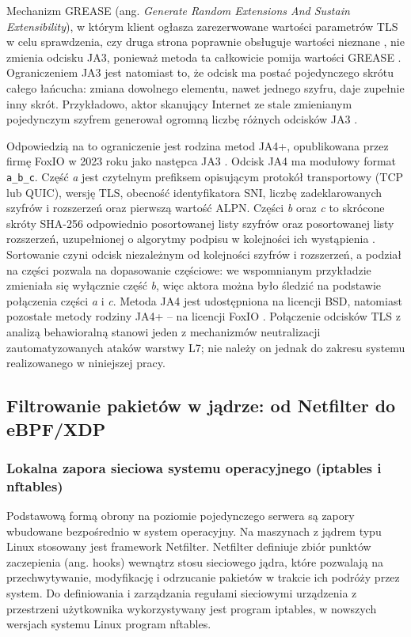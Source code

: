 \documentclass[a4paper,12pt]{article}
\begin{document}
Mechanizm GREASE (ang. \textit{Generate Random Extensions And Sustain Extensibility}), w którym klient ogłasza zarezerwowane wartości parametrów TLS w celu sprawdzenia, czy druga strona poprawnie obsługuje wartości nieznane \cite{rfc8701}, nie zmienia odcisku JA3, ponieważ metoda ta całkowicie pomija wartości GREASE \cite{althouse2017ja3}. Ograniczeniem JA3 jest natomiast to, że odcisk ma postać pojedynczego skrótu całego łańcucha: zmiana dowolnego elementu, nawet jednego szyfru, daje zupełnie inny skrót. Przykładowo, aktor skanujący Internet ze stale zmienianym pojedynczym szyfrem generował ogromną liczbę różnych odcisków JA3 \cite{althouse2023ja4}.

Odpowiedzią na to ograniczenie jest rodzina metod JA4+, opublikowana przez firmę FoxIO w 2023 roku jako następca JA3 \cite{althouse2023ja4}. Odcisk JA4 ma modułowy format \texttt{a\_b\_c}. Część \textit{a} jest czytelnym prefiksem opisującym protokół transportowy (TCP lub QUIC), wersję TLS, obecność identyfikatora SNI, liczbę zadeklarowanych szyfrów i rozszerzeń oraz pierwszą wartość ALPN. Części \textit{b} oraz \textit{c} to skrócone skróty SHA-256 odpowiednio posortowanej listy szyfrów oraz posortowanej listy rozszerzeń, uzupełnionej o algorytmy podpisu w kolejności ich wystąpienia \cite{althouse2023ja4}. Sortowanie czyni odcisk niezależnym od kolejności szyfrów i rozszerzeń, a podział na części pozwala na dopasowanie częściowe: we wspomnianym przykładzie zmieniała się wyłącznie część \textit{b}, więc aktora można było śledzić na podstawie połączenia części \textit{a} i \textit{c}. Metoda JA4 jest udostępniona na licencji BSD, natomiast pozostałe metody rodziny JA4+ -- na licencji FoxIO \cite{althouse2023ja4}. Połączenie odcisków TLS z analizą behawioralną stanowi jeden z mechanizmów neutralizacji zautomatyzowanych ataków warstwy L7; nie należy on jednak do zakresu systemu realizowanego w niniejszej pracy.

\subsection{Filtrowanie pakietów w jądrze: od Netfilter do eBPF/XDP}\label{sec:xdp}
\subsubsection{Lokalna zapora sieciowa systemu operacyjnego (iptables i nftables)}
Podstawową formą obrony na poziomie pojedynczego serwera są zapory wbudowane bezpośrednio w system operacyjny. Na maszynach z jądrem typu Linux stosowany jest framework Netfilter. Netfilter definiuje zbiór punktów zaczepienia (ang. hooks) wewnątrz stosu sieciowego jądra, które pozwalają na przechwytywanie, modyfikację i odrzucanie pakietów w trakcie ich podróży przez system. Do definiowania i zarządzania regułami sieciowymi urządzenia z przestrzeni użytkownika wykorzystywany jest program iptables, w nowszych wersjach systemu Linux program nftables.
\end{document}
